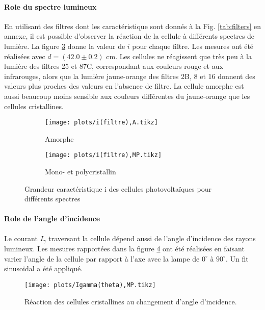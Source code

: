 \paragraph*{Role du spectre lumineux}
En utilisant des filtres dont les caractéristique sont donnés à la Fig. \ref{tab:filters} en annexe, il est possible d'observer la réaction de la cellule à différents spectres de lumière. La figure \ref{plot:6} donne la valeur de \(i\) pour chaque filtre. Les mesures ont été réalisées avec \(d = (42.0 \pm 0.2)\) \unit{\centi\meter}. Les cellules ne réagissent que très peu à la lumière des filtres 25 et 87C, correspondant aux couleurs rouge et aux infrarouges, alors que la lumière jaune-orange des filtres 2B, 8 et 16 donnent des valeurs plus proches des valeurs en l'absence de filtre. La cellule amorphe est aussi beaucoup moins sensible aux couleurs différentes du jaune-orange que les cellules cristallines.

\begin{figure}[H]
    \centering
    \begin{subfigure}[t]{0.48\linewidth}
        \centering
        \texttt{[image: plots/i(filtre),A.tikz]}
        \caption{Amorphe}
        \label{plot:6a}
    \end{subfigure}
    \begin{subfigure}[t]{0.48\linewidth}
        \centering
        \texttt{[image: plots/i(filtre),MP.tikz]}
        \caption{Mono- et polycristallin}
        \label{plot:6b}
    \end{subfigure}
    \caption{Grandeur caractéristique i des cellules photovoltaïques pour différents spectres}
    \label{plot:6}
\end{figure}

\paragraph*{Role de l'angle d'incidence}
Le courant \(I_\gamma\) traversant la cellule dépend aussi de l'angle d'incidence des rayons lumineux. Les mesures rapportées dans la figure \ref{plot:7} ont été réalisées en faisant varier l'angle de la cellule par rapport à l'axe avec la lampe de \(0^{\circ}\) à \(90^{\circ}\). Un fit sinusoïdal a été appliqué.

\begin{figure}[H]
    \centering
    \texttt{[image: plots/Igamma(theta),MP.tikz]}
    \caption{Réaction des cellules cristallines au changement d'angle d'incidence.}
    \label{plot:7}
\end{figure}



